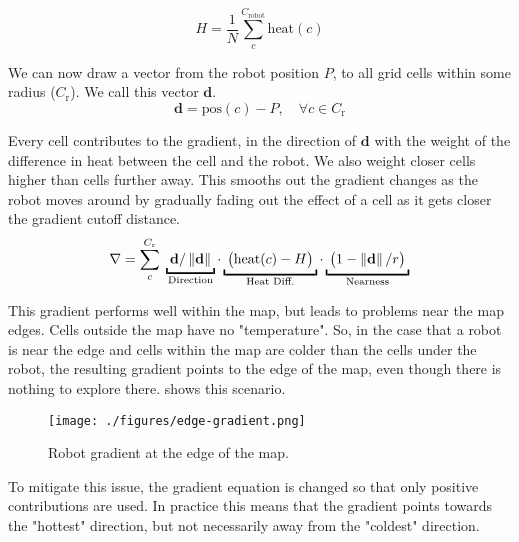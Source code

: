 \begin{equation}
\label{eq:robot-heat}
    H = \frac{1}{N} \sum_c^{C_\mathrm{robot}} \mathrm{heat}(c)
\end{equation}

We can now draw a vector from the robot position $P$, to all grid cells within some radius ($C_\mathrm{r}$). We call this vector $\mathbf{d}$.
\begin{equation}
    \mathbf{d} = \mathrm{pos}(c) - P, \quad \forall c \in C_\mathrm{r}
\end{equation}

Every cell contributes to the gradient, in the direction of $\mathbf{d}$ with the weight of the difference in heat between the cell and the robot. We also weight closer cells higher than cells further away. This smooths out the gradient changes as the robot moves around by gradually fading out the effect of a cell as it gets closer the gradient cutoff distance.
\begin{equation}
    \nabla = \sum_c^{C_\mathrm{r}} \;
    \underbracket{\; \mathbf{d}/\norm{\mathbf{d}}      \;}_\text{\makebox[0pt]{Direction}} \cdot
    \underbracket{\; \big(\mathrm{heat}(c) - H\big)    \;}_\text{Heat Diff.} \cdot
    \underbracket{\; \big(1 - \norm{\mathbf{d}}/r\big) \;}_\text{Nearness}
\end{equation}

This gradient performs well within the map, but leads to problems near the map edges. Cells outside the map have no "temperature". {\color{red}So}, in the case that a robot is near the edge and cells within the map are colder than the cells under the robot, the resulting gradient points to the edge of the map, even though there is nothing to explore there.  shows this scenario.

\begin{figure}[h]
    \begin{center}
        \texttt{[image: ./figures/edge-gradient.png]}
    \end{center}
    \caption{Robot gradient at the edge of the map.}
    \label{fig:edge-gradient}
\end{figure}

To mitigate this issue, the gradient equation is changed so that only positive contributions are used. In practice this means that the gradient points towards the "hottest" direction, but not necessarily away from the "coldest" direction.

